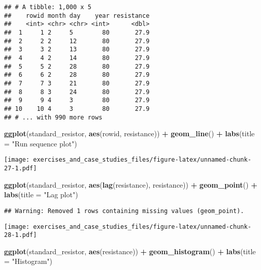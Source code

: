 \documentclass[]{book}
\newenvironment{Shaded}{\begin{snugshade}}{\end{snugshade}}
\newcommand{\DataTypeTok}[1]{\textcolor[rgb]{0.13,0.29,0.53}{#1}}
\newcommand{\KeywordTok}[1]{\textcolor[rgb]{0.13,0.29,0.53}{\textbf{#1}}}
\newcommand{\NormalTok}[1]{#1}
\newcommand{\OperatorTok}[1]{\textcolor[rgb]{0.81,0.36,0.00}{\textbf{#1}}}
\newcommand{\StringTok}[1]{\textcolor[rgb]{0.31,0.60,0.02}{#1}}
\theoremstyle{definition}
\theoremstyle{definition}
\theoremstyle{definition}
\theoremstyle{remark}
\begin{document}
\begin{verbatim}
## # A tibble: 1,000 x 5
##    rowid month day    year resistance
##    <int> <chr> <chr> <int>      <dbl>
##  1     1 2     5        80       27.9
##  2     2 2     12       80       27.9
##  3     3 2     13       80       27.9
##  4     4 2     14       80       27.9
##  5     5 2     28       80       27.9
##  6     6 2     28       80       27.9
##  7     7 3     21       80       27.9
##  8     8 3     24       80       27.9
##  9     9 4     3        80       27.9
## 10    10 4     3        80       27.9
## # ... with 990 more rows
\end{verbatim}

\begin{Shaded}
\begin{Highlighting}[]
\KeywordTok{ggplot}\NormalTok{(standard_resistor, }\KeywordTok{aes}\NormalTok{(rowid, resistance)) }\OperatorTok{+}
\StringTok{  }\KeywordTok{geom_line}\NormalTok{() }\OperatorTok{+}
\StringTok{  }\KeywordTok{labs}\NormalTok{(}\DataTypeTok{title =} \StringTok{"Run sequence plot"}\NormalTok{)}
\end{Highlighting}
\end{Shaded}

\texttt{[image: exercises\_and\_case\_studies\_files/figure-latex/unnamed-chunk-27-1.pdf]}

\begin{Shaded}
\begin{Highlighting}[]
\KeywordTok{ggplot}\NormalTok{(standard_resistor, }\KeywordTok{aes}\NormalTok{(}\KeywordTok{lag}\NormalTok{(resistance), resistance)) }\OperatorTok{+}
\StringTok{  }\KeywordTok{geom_point}\NormalTok{() }\OperatorTok{+}
\StringTok{  }\KeywordTok{labs}\NormalTok{(}\DataTypeTok{title =} \StringTok{"Lag plot"}\NormalTok{)}
\end{Highlighting}
\end{Shaded}

\begin{verbatim}
## Warning: Removed 1 rows containing missing values (geom_point).
\end{verbatim}

\texttt{[image: exercises\_and\_case\_studies\_files/figure-latex/unnamed-chunk-28-1.pdf]}

\begin{Shaded}
\begin{Highlighting}[]
\KeywordTok{ggplot}\NormalTok{(standard_resistor, }\KeywordTok{aes}\NormalTok{(resistance)) }\OperatorTok{+}
\StringTok{  }\KeywordTok{geom_histogram}\NormalTok{() }\OperatorTok{+}
\StringTok{  }\KeywordTok{labs}\NormalTok{(}\DataTypeTok{title =} \StringTok{"Histogram"}\NormalTok{)}
\end{Highlighting}
\end{Shaded}
\end{document}
